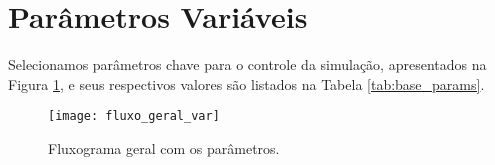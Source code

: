 \section{Parâmetros Variáveis}
Selecionamos parâmetros chave para o controle da simulação, apresentados na Figura \ref{fig:fluxo_geral_var}, e seus respectivos valores são listados na Tabela \ref{tab:base_params}.

\begin{figure}[H]
    \centering
    \caption{Fluxograma geral com os parâmetros.}
    \texttt{[image: fluxo\_geral\_var]}

    \label{fig:fluxo_geral_var}
\end{figure}
